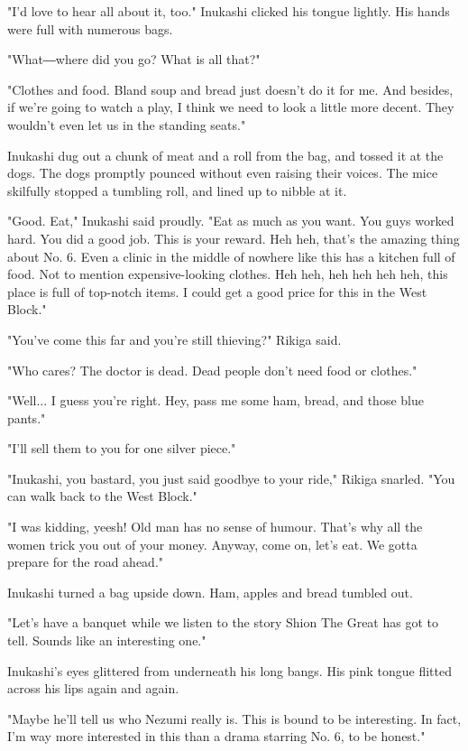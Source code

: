 "I'd love to hear all about it, too." Inukashi clicked his tongue
lightly. His hands were full with numerous bags.

"What―where did you go? What is all that?"

"Clothes and food. Bland soup and bread just doesn't do it for me. And
besides, if we're going to watch a play, I think we need to look a
little more decent. They wouldn't even let us in the standing seats."

Inukashi dug out a chunk of meat and a roll from the bag, and tossed it
at the dogs. The dogs promptly pounced without even raising their
voices. The mice skilfully stopped a tumbling roll, and lined up to
nibble at it.

"Good. Eat," Inukashi said proudly. "Eat as much as you want. You guys
worked hard. You did a good job. This is your reward. Heh heh, that's
the amazing thing about No. 6. Even a clinic in the middle of nowhere
like this has a kitchen full of food. Not to mention expensive-looking
clothes. Heh heh, heh heh heh heh, this place is full of top-notch
items. I could get a good price for this in the West Block."

"You've come this far and you're still thieving?" Rikiga said.

"Who cares? The doctor is dead. Dead people don't need food or clothes."

"Well... I guess you're right. Hey, pass me some ham, bread, and those
blue pants."

"I'll sell them to you for one silver piece."

"Inukashi, you bastard, you just said goodbye to your ride," Rikiga
snarled. "You can walk back to the West Block."

"I was kidding, yeesh! Old man has no sense of humour. That's why all
the women trick you out of your money. Anyway, come on, let's eat. We
gotta prepare for the road ahead."

Inukashi turned a bag upside down. Ham, apples and bread tumbled out.

"Let's have a banquet while we listen to the story Shion The Great has
got to tell. Sounds like an interesting one."

Inukashi's eyes glittered from underneath his long bangs. His pink
tongue flitted across his lips again and again.

"Maybe he'll tell us who Nezumi really is. This is bound to be
interesting. In fact, I'm way more interested in this than a drama
starring No. 6, to be honest."

